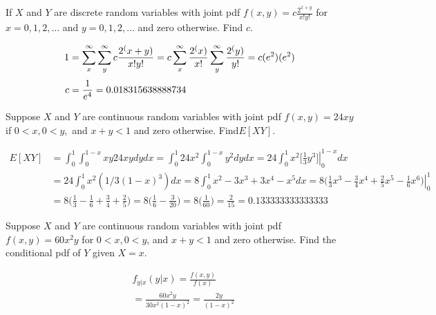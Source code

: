 \documentclass[answers]{exam}
\begin{document}
\begin{questions}
\question 
If $X$ and $Y$ are discrete random variables with joint pdf \(f(x,y) = c\frac{2^{x+y}}{x!y!}\) 
for \(x=0,1,2,\ldots\) and \(y=0,1,2,\ldots\) and zero otherwise. Find $c$.
\begin{solution}
	\begin{align*}
		1 &= \sum_{x}^{\infty}\sum_{y}^{\infty} c \frac{2^(x+y)}{x!y!}
		= c\sum_{x}^{\infty} \frac{2^(x)}{x!} \sum_{y}^{\infty} \frac{2^(y)}{y!}
		= c(e^2)(e^2) 
		\\[\jot]
		c &= \frac{1}{e^4} = 0.018315638888734
	\end{align*}
\end{solution}

\question 
Suppose $X$ and $Y$ are continuous random variables with joint pdf
\(f(x,y)= 24xy\) if \(0<x,0<y,\) and \(x+y<1\) and zero otherwise. Find\(E[XY]\).
\begin{solution}
	\begin{align*}
		E[XY]
		&= \int_{0}^{1}\int_{0}^{1-x} xy 24 xy dy dx
		= \int_{0}^{1} 24x^2 \int_{0}^{1-x} y^2 dy dx
		= 24 \int_{0}^{1} x^2 \bigg[\left. \frac{1}{3}y^3 \bigg]\right|_{0}^{1-x} dx
		\\&= 24 \int_{0}^{1} x^2 (1/3(1-x)^3) dx
		= 8 \int_{0}^{1} x^2-3x^3+3x^4-x^5  dx
		= 8 \left. \bigg(\frac{1}{3}x^3-\frac{3}{4}x^4+\frac{2}{5}x^5-\frac{1}{6}x^6\bigg) \right|_{0}^{1}
		\\&= 8\bigg(\frac{1}{3}-\frac{1}{6}+\frac{3}{4}+\frac{2}{5}\bigg)
		= 8\bigg(\frac{1}{6}-\frac{3}{20}\bigg)
		= 8\bigg(\frac{1}{60}\bigg)
		= \frac{2}{15} = 0.133333333333333
	\end{align*}
\end{solution}

\question 
Suppose $X$ and $Y$ are continuous random variables with joint pdf
\(f(x,y) = 60x^2y\) for \(0<x,0<y\), and \(x+y<1\) and zero otherwise. Find the
conditional pdf of $Y$ given \(X=x\).
\begin{solution}
	\begin{align*}
		&f_{y|x}(y|x) 
		= \frac{f(x,y)}{f(x)} 
		\\&= \frac{60x^2y}{30x^2(1-x)^2}
		= \frac{2y}{(1-x)^2}
	\end{align*}
\end{solution}

\end{questions}
\end{document}
